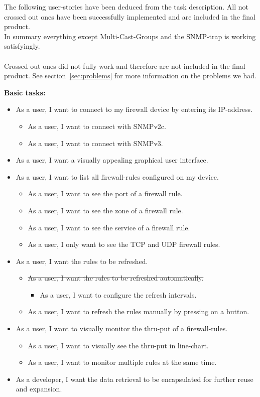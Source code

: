 \documentclass[11pt, a4paper]{article}
\begin{document}
The following user-stories have been deduced from the task description. All not crossed out ones have been successfully implemented and are included in the final product. \\
In summary everything except Multi-Cast-Groups and the SNMP-trap is working satisfyingly.
\\\\
Crossed out ones did not fully work and therefore are not included in the final product. See section~\ref{sec:problems} for more information on the problems we had.

\vspace{10pt}
\noindent \textbf{Basic tasks:}
\begin{itemize}
\item As a user, I want to connect to my firewall device by entering its IP-address.
\begin{itemize}
\item As a user, I want to connect with SNMPv2c.
\item As a user, I want to connect with SNMPv3.
\end{itemize}
\item As a user, I want a visually appealing graphical user interface.
\item As a user, I want to list all firewall-rules configured on my device.
\begin{itemize}
\item As a user, I want to see the port of a firewall rule.
\item As a user, I want to see the zone of a firewall rule.
\item As a user, I want to see the service of a firewall rule.
\item As a user, I only want to see the TCP and UDP firewall rules.
\end{itemize}
\item As a user, I want the rules to be refreshed.
\begin{itemize}
\item \sout{As a user, I want the rules to be refreshed automatically.}
\begin{itemize}
\item As a user, I want to configure the refresh intervals.
\end{itemize}
\item As a user, I want to refresh the rules manually by pressing on a button.
\end{itemize}
\item As a user, I want to visually monitor the thru-put of a firewall-rules.
\begin{itemize}
\item As a user, I want to visually see the thru-put in line-chart.
\item As a user, I want to monitor multiple rules at the same time.
\end{itemize}
\item As a developer, I want the data retrieval to be encapsulated for further reuse and expansion.
\end{itemize}
\end{document}
